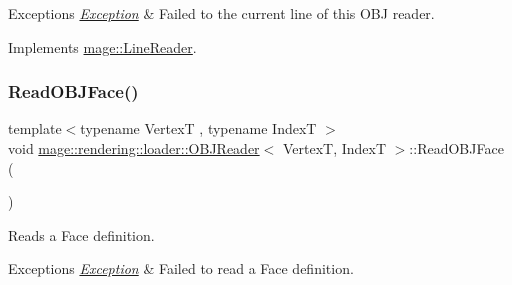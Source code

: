 \begin{DoxyExceptions}{Exceptions}
{\em \mbox{\hyperlink{classmage_1_1_exception}{Exception}}} & Failed to the current line of this O\+BJ reader. \\
\hline
\end{DoxyExceptions}


Implements \mbox{\hyperlink{classmage_1_1_line_reader_a8c81989a9d59ae31dd19e6d3961cfaf1}{mage\+::\+Line\+Reader}}.

\mbox{\label{classmage_1_1rendering_1_1loader_1_1_o_b_j_reader_a58d5c4e4a5a82714567413b6e17a9ec7}} 
\subsubsection{\texorpdfstring{Read\+O\+B\+J\+Face()}{ReadOBJFace()}}
{\footnotesize\ttfamily template$<$typename VertexT , typename IndexT $>$ \\
void \mbox{\hyperlink{classmage_1_1rendering_1_1loader_1_1_o_b_j_reader}{mage\+::rendering\+::loader\+::\+O\+B\+J\+Reader}}$<$ VertexT, IndexT $>$\+::Read\+O\+B\+J\+Face (\begin{DoxyParamCaption}{ }\end{DoxyParamCaption})\hspace{0.3cm}{\ttfamily [private]}}

Reads a Face definition.


\begin{DoxyExceptions}{Exceptions}
{\em \mbox{\hyperlink{classmage_1_1_exception}{Exception}}} & Failed to read a Face definition. \\
\hline
\end{DoxyExceptions}
\mbox{\label{classmage_1_1rendering_1_1loader_1_1_o_b_j_reader_a4e733a0afea4b82e3aea89fe58f5bfba}} 
